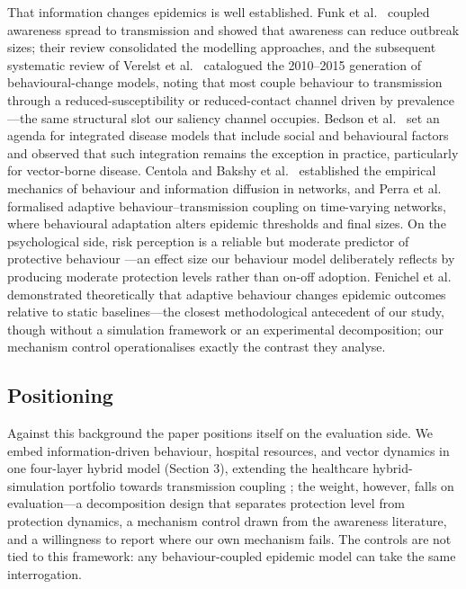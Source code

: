 \documentclass[]{interact}
\begin{document}
That information changes epidemics is well established. Funk et al.\ \cite{funk2009spread} coupled awareness spread to transmission and showed that awareness can reduce outbreak sizes; their review \cite{funk2010modelling} consolidated the modelling approaches, and the subsequent systematic review of Verelst et al.\ \cite{verelst2016behavioural} catalogued the 2010--2015 generation of behavioural-change models, noting that most couple behaviour to transmission through a reduced-susceptibility or reduced-contact channel driven by prevalence---the same structural slot our saliency channel occupies. Bedson et al.\ \cite{bedson2021review} set an agenda for integrated disease models that include social and behavioural factors and observed that such integration remains the exception in practice, particularly for vector-borne disease. Centola \cite{centola2010spread} and Bakshy et al.\ \cite{bakshy2012role} established the empirical mechanics of behaviour and information diffusion in networks, and Perra et al.\ \cite{perra2012activity} formalised adaptive behaviour--transmission coupling on time-varying networks, where behavioural adaptation alters epidemic thresholds and final sizes. On the psychological side, risk perception is a reliable but moderate predictor of protective behaviour \cite{rosenstock1974historical,rogers1975protection,ajzen1991theory,brewer2007meta,ferrer2015risk}---an effect size our behaviour model deliberately reflects by producing moderate protection levels rather than on-off adoption. Fenichel et al.\ \cite{fenichel2011adaptive} demonstrated theoretically that adaptive behaviour changes epidemic outcomes relative to static baselines---the closest methodological antecedent of our study, though without a simulation framework or an experimental decomposition; our mechanism control operationalises exactly the contrast they analyse.

\subsection{Positioning}

Against this background the paper positions itself on the evaluation side. We embed information-driven behaviour, hospital resources, and vector dynamics in one four-layer hybrid model (Section 3), extending the healthcare hybrid-simulation portfolio towards transmission coupling \cite{kar2025hybrid}; the weight, however, falls on evaluation---a decomposition design that separates protection level from protection dynamics, a mechanism control drawn from the awareness literature, and a willingness to report where our own mechanism fails. The controls are not tied to this framework: any behaviour-coupled epidemic model can take the same interrogation.
\end{document}
